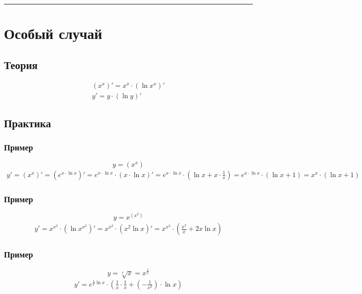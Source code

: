 \documentclass{article}
\begin{document}
\par\noindent\rule{\textwidth}{1pt}
\section{Особый случай}

\subsection{Теория}
\begin{gather*}
    (x^x)' = x^x \cdot (\ln x^x)' \\
    y' = y \cdot (\ln y)'
\end{gather*}


\subsection{Практика}

\subsubsection{Пример}
\[
    y = \left( x^x \right)
\]
\begin{gather*}
    y' = \left( x^x \right)' = 
    \left( e^{x \cdot \ln x} \right)' =
    e^{x \cdot \ln x} \cdot \left( x \cdot \ln x \right)' =
    e^{x \cdot \ln x} \cdot \left( \ln x + x \cdot \frac{1}{x} \right) =
    e^{x \cdot \ln x} \cdot \left( \ln x + 1 \right) =
    x^x \cdot (\ln x + 1)
\end{gather*}

\subsubsection{Пример}
\[
    y = x^{(x^2)}
\]
\begin{gather*}
    y' = x^{x^2} \cdot \left( \ln x^{x^2} \right)' =
    x^{x^2} \cdot \left( x^2 \ln x \right)' =
    x^{x^2} \cdot \left( \frac{x^2}{x} + 2x \ln x \right)
\end{gather*}

\subsubsection{Пример}
\[
    y = \sqrt[x]{x} = x^{\frac{1}{x}}
\]
\begin{gather*}
    y' = e^{\frac{1}{x} \ln x} \cdot \left( \frac{1}{x} \cdot \frac{1}{x} + \left( -\frac{1}{x^2} \right) \cdot \ln x \right)
\end{gather*}
\end{document}
